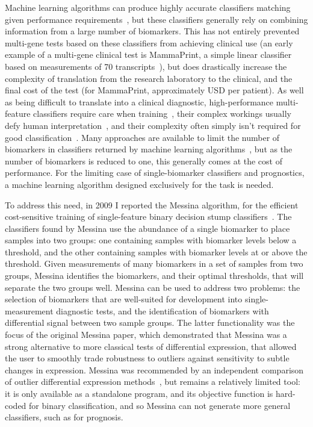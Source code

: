 \documentclass[dissertation.tex]{subfiles}
\begin{document}
Machine learning algorithms can produce highly accurate classifiers matching given performance requirements~\cite{Bach2006}, but these classifiers generally rely on combining information from a large number of biomarkers.  This has not entirely prevented multi-gene tests based on these classifiers from achieving clinical use (an early example of a multi-gene clinical test is MammaPrint\texttrademark, a simple linear classifier based on measurements of 70 transcripts~\cite{Veer2002}), but does drastically increase the complexity of translation from the research laboratory to the clinical, and the final cost of the test (for MammaPrint, approximately  USD per patient).  As well as being difficult to translate into a clinical diagnostic, high-performance multi-feature classifiers require care when training~\cite{Aliferis2009}, their complex workings usually defy human interpretation~\cite{Breiman2001b}, and their complexity often simply isn't required for good classification~\cite{Grate2005}.  Many approaches are available to limit the number of biomarkers in classifiers returned by machine learning algorithms~\cite{Guyon2003}, but as the number of biomarkers is reduced to one, this generally comes at the cost of performance.  For the limiting case of single-biomarker classifiers and prognostics, a machine learning algorithm designed exclusively for the task is needed.

To address this need, in 2009 I reported the Messina algorithm, for the efficient cost-sensitive training of single-feature binary decision stump classifiers~\cite{Pinese2009}.  The classifiers found by Messina use the abundance of a single biomarker to place samples into two groups: one containing samples with biomarker levels below a threshold, and the other containing samples with biomarker levels at or above the threshold.  Given measurements of many biomarkers in a set of samples from two groups, Messina identifies the biomarkers, and their optimal thresholds, that will separate the two groups well.  Messina can be used to address two problems: the selection of biomarkers that are well-suited for development into single-measurement diagnostic tests, and the identification of biomarkers with differential signal between two sample groups.  The latter functionality was the focus of the original Messina paper, which demonstrated that Messina was a strong alternative to more classical tests of differential expression, that allowed the user to smoothly trade robustness to outliers against sensitivity to subtle changes in expression.  Messina was recommended by an independent comparison of outlier differential expression methods~\cite{Karrila2011}, but remains a relatively limited tool: it is only available as a standalone program, and its objective function is hard-coded for binary classification, and so Messina can not generate more general classifiers, such as for prognosis.
\end{document}
